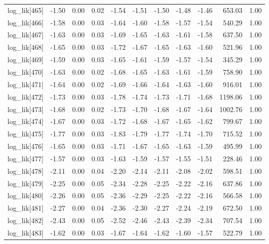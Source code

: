 \begin{table}[ht]
\begin{tabular}{rrrrrrrrrrr}
  log\_lik[465] & -1.50 & 0.00 & 0.02 & -1.54 & -1.51 & -1.50 & -1.48 & -1.46 & 653.03 & 1.00 \\ 
  log\_lik[466] & -1.58 & 0.00 & 0.03 & -1.64 & -1.60 & -1.58 & -1.57 & -1.54 & 540.29 & 1.00 \\ 
  log\_lik[467] & -1.63 & 0.00 & 0.03 & -1.69 & -1.65 & -1.63 & -1.61 & -1.58 & 637.50 & 1.00 \\ 
  log\_lik[468] & -1.65 & 0.00 & 0.03 & -1.72 & -1.67 & -1.65 & -1.63 & -1.60 & 521.96 & 1.00 \\ 
  log\_lik[469] & -1.59 & 0.00 & 0.03 & -1.65 & -1.61 & -1.59 & -1.57 & -1.54 & 345.29 & 1.00 \\ 
  log\_lik[470] & -1.63 & 0.00 & 0.02 & -1.68 & -1.65 & -1.63 & -1.61 & -1.59 & 758.90 & 1.00 \\ 
  log\_lik[471] & -1.64 & 0.00 & 0.02 & -1.69 & -1.66 & -1.64 & -1.63 & -1.60 & 916.01 & 1.00 \\ 
  log\_lik[472] & -1.73 & 0.00 & 0.03 & -1.78 & -1.74 & -1.73 & -1.71 & -1.68 & 1198.06 & 1.00 \\ 
  log\_lik[473] & -1.68 & 0.00 & 0.02 & -1.73 & -1.70 & -1.68 & -1.67 & -1.64 & 1002.76 & 1.00 \\ 
  log\_lik[474] & -1.67 & 0.00 & 0.03 & -1.72 & -1.68 & -1.67 & -1.65 & -1.62 & 799.67 & 1.00 \\ 
  log\_lik[475] & -1.77 & 0.00 & 0.03 & -1.83 & -1.79 & -1.77 & -1.74 & -1.70 & 715.52 & 1.00 \\ 
  log\_lik[476] & -1.65 & 0.00 & 0.03 & -1.71 & -1.67 & -1.65 & -1.63 & -1.59 & 495.99 & 1.00 \\ 
  log\_lik[477] & -1.57 & 0.00 & 0.03 & -1.63 & -1.59 & -1.57 & -1.55 & -1.51 & 228.46 & 1.00 \\ 
  log\_lik[478] & -2.11 & 0.00 & 0.04 & -2.20 & -2.14 & -2.11 & -2.08 & -2.02 & 598.51 & 1.00 \\ 
  log\_lik[479] & -2.25 & 0.00 & 0.05 & -2.34 & -2.28 & -2.25 & -2.22 & -2.16 & 637.86 & 1.00 \\ 
  log\_lik[480] & -2.26 & 0.00 & 0.05 & -2.36 & -2.29 & -2.25 & -2.22 & -2.16 & 566.58 & 1.00 \\ 
  log\_lik[481] & -2.27 & 0.00 & 0.04 & -2.36 & -2.30 & -2.27 & -2.24 & -2.19 & 672.50 & 1.00 \\ 
  log\_lik[482] & -2.43 & 0.00 & 0.05 & -2.52 & -2.46 & -2.43 & -2.39 & -2.34 & 707.54 & 1.00 \\ 
  log\_lik[483] & -1.62 & 0.00 & 0.03 & -1.67 & -1.64 & -1.62 & -1.60 & -1.57 & 522.79 & 1.00 \\ 

\end{tabular}
\end{table}
